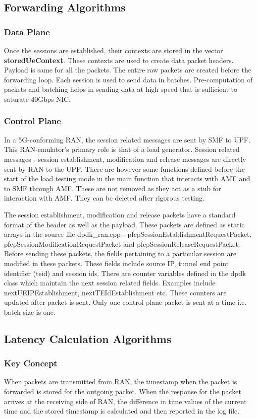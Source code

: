 \documentclass{article}
\begin{document}
\subsection{Forwarding Algorithms}
\subsubsection{Data Plane}
Once the sessions are established, their contexts are stored in the vector \textbf{storedUeContext}. These contexts are used to
create data packet headers. Payload is same for all the packets. The entire raw packets are created before
the forwarding loop. Each session is used to send data in batches. Pre-computation of packets and batching
helps in sending data at high speed that is sufficient to saturate 40Gbps NIC.

\subsubsection{Control Plane}
In a 5G-conforming RAN, the session related messages are sent by SMF to UPF.
This RAN-emulator's primary role is that of a load generator. Session related messages - session establishment, modification and release messages are directly sent by RAN to the UPF.
There are however some functions defined before the start of the load testing mode in the main function that interacts with AMF and to SMF through AMF. These are not removed as they act as a stub for interaction with AMF. They can be deleted after rigorous testing.

The session establishment, modification and release packets have a standard format of the header as well as the
payload. These packets are defined as static arrays in the source file dpdk\_ran.cpp - pfcpSessionEstablishmentRequestPacket, pfcpSessionModificationRequestPacket and pfcpSessionReleaseRequestPacket.
Before sending these packets, the fields pertaining to a particular session are modified in these packets.
These fields include source IP, tunnel end point identifier (teid) and session ids.
There are counter variables defined in the dpdk class which maintain the next session related fields.
Examples include nextUEIPEstablishment, nextTEIdEstablishment etc. These counters are updated after packet is sent.
Only one control plane packet is sent at a time i.e. batch size is one.
\subsection{Latency Calculation Algorithms}
\subsubsection{Key Concept}
When packets are transmitted from RAN, the timestamp when the packet is forwarded is stored for the outgoing packet. When the response for the packet arrives at the receiving side of RAN, the difference in time values of the current time and the stored timestamp  is calculated and then reported in the log file.
\end{document}
